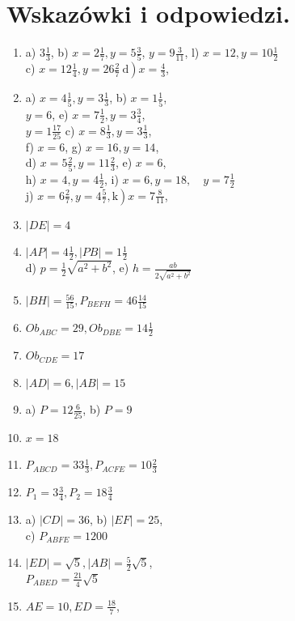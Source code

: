\documentclass[10pt]{article}
\begin{document}
\section*{Wskazówki i odpowiedzi.}
\begin{enumerate}
  \item a) \(3 \frac{1}{3}\), b) \(x=2 \frac{1}{7}, y=5 \frac{3}{5}\), \(y=9 \frac{3}{11}\), l) \(x=12, y=10 \frac{1}{2}\)\\
c) \(\left.x=12 \frac{1}{4}, y=26 \frac{2}{7} \mathrm{~d}\right) x=\frac{4}{3}\),
  \item a) \(x=4 \frac{1}{5}, y=3 \frac{1}{3}\), b) \(x=1 \frac{1}{5}\),\\
\(y=6\), e) \(x=7 \frac{1}{2}, y=3 \frac{3}{4}\),\\
\(y=1 \frac{17}{25}\) c) \(x=8 \frac{1}{3}, y=3 \frac{1}{3}\),\\
f) \(x=6\), g) \(x=16, y=14\),\\
d) \(x=5 \frac{2}{5}, y=11 \frac{2}{3}\), e) \(x=6\),\\
h) \(x=4, y=4 \frac{1}{2}\), i) \(x=6, y=18, \quad y=7 \frac{1}{2}\)\\
j) \(\left.x=6 \frac{2}{7}, y=4 \frac{5}{7}, \mathrm{k}\right) x=7 \frac{8}{11}\),
  \item \(|D E|=4\)
  \item \(|A P|=4 \frac{1}{2},|P B|=1 \frac{1}{2}\)\\
d) \(p=\frac{1}{2} \sqrt{a^{2}+b^{2}}\), e) \(h=\frac{a b}{2 \sqrt{a^{2}+b^{2}}}\)
  \item \(|B H|=\frac{56}{15}, P_{B E F H}=46 \frac{14}{15}\)
  \item \(O b_{A B C}=29, O b_{D B E}=14 \frac{1}{2}\)
  \item \(O b_{C D E}=17\)
  \item \(|A D|=6,|A B|=15\)
  \item a) \(P=12 \frac{6}{25}\), b) \(P=9\)
  \item \(x=18\)
  \item \(P_{A B C D}=33 \frac{1}{3}, P_{A C F E}=10 \frac{2}{3}\)
  \item \(P_{1}=3 \frac{3}{4}, P_{2}=18 \frac{3}{4}\)
  \item a) \(|C D|=36\), b) \(|E F|=25\),\\
c) \(P_{A B F E}=1200\)
  \item \(|E D|=\sqrt{5},|A B|=\frac{5}{2} \sqrt{5}\),\\
\(P_{A B E D}=\frac{21}{4} \sqrt{5}\)
  \item \(A E=10, E D=\frac{18}{7}\),\\

\end{enumerate}
\end{document}
